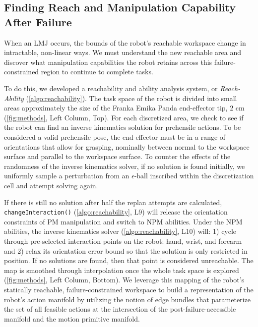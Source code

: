 \subsection{Finding Reach and Manipulation Capability After Failure}\label{sec:methods-reachability}
When an LMJ occurs, the bounds of the robot's reachable workspace change in intractable, non-linear ways. We must understand the new reachable area and discover what manipulation capabilities the robot retains across this failure-constrained region to continue to complete tasks.

To do this, we developed a reachability and ability analysis system, or \textit{Reach-Ability} (\cref{algo:reachability}). The task space of the robot is divided into small areas approximately the size of the Franka Emika Panda end-effector tip, $2$ cm (\cref{fig:methods}, Left Column, Top). For each discretized area, we check to see if the robot can find an inverse kinematics solution for prehensile actions. To be considered a valid prehensile pose, the end-effector must be in a range of orientations that allow for grasping, nominally between normal to the workspace surface and parallel to the workspace surface. To counter the effects of the randomness of the inverse kinematics solver, if no solution is found initially, we uniformly sample a perturbation from an $\epsilon$-ball inscribed within the discretization cell and attempt solving again. 

If there is still no solution after half the replan attempts are calculated, \texttt{changeInteraction()} (\cref{algo:reachability}, L9) will release the orientation constraints of PM manipulation and switch to NPM abilities.%
Under the NPM abilities, the inverse kinematics solver (\cref{algo:reachability}, L10) will: 1) cycle through pre-selected interaction points on the robot: hand, wrist, and forearm and 2) relax its orientation error bound so that the solution is only restricted in position. If no solutions are found, then that point is considered unreachable. The map is smoothed through interpolation once the whole task space is explored (\cref{fig:methods}, Left Column, Bottom).  
We leverage this mapping of the robot's statically reachable, failure-constrained workspace to build a representation of the robot's action manifold by utilizing the notion of edge bundles that parameterize the set of all feasible actions at the intersection of the post-failure-accessible manifold and the motion primitive manifold. 


